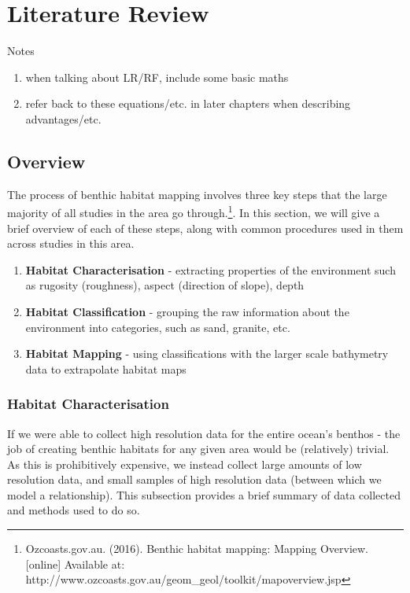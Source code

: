 \chapter{Literature Review} \label{chap:litreview}

Notes
\begin{enumerate}
    \item when talking about LR/RF, include some basic maths
    \item refer back to these equations/etc. in later chapters when describing advantages/etc.
\end{enumerate}

           \section{Overview}
            The process of benthic habitat mapping involves three key steps that the large majority of all studies in the area go through.\footnote{Ozcoasts.gov.au. (2016). Benthic habitat mapping: Mapping Overview. [online] Available at: http://www.ozcoasts.gov.au/geom\_geol/toolkit/mapoverview.jsp}. In this section, we will give a brief overview of each of these steps, along with common procedures used in them across studies in this area.

            \begin{enumerate}
                \item \textbf{Habitat Characterisation} - extracting properties of the environment such as rugosity (roughness), aspect (direction of slope), depth
                \item \textbf{Habitat Classification} - grouping the raw information about the environment into categories, such as sand, granite, etc.
                \item \textbf{Habitat Mapping} - using classifications with the larger scale bathymetry data to extrapolate habitat maps 
            \end{enumerate}

            \subsection{Habitat Characterisation}
             If we were able to collect high resolution data for the entire ocean's benthos - the job of creating benthic habitats for any given area would be (relatively) trivial. As this is prohibitively expensive, we instead collect large amounts of low resolution data, and small samples of high resolution data (between which we model a relationship). This subsection provides a brief summary of data collected and methods used to do so.


